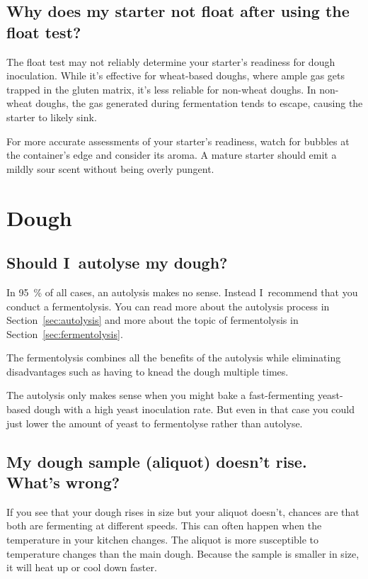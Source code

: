 \subsection{Why does my starter not float after using the float test?}
The float test may not reliably determine your starter's readiness for dough
inoculation. While it's effective for wheat-based doughs, where ample gas gets
trapped in the gluten matrix, it's less reliable for non-wheat doughs. In non-
wheat doughs, the gas generated during fermentation tends to escape, causing
the starter to likely sink.

For more accurate assessments of your starter's readiness, watch for bubbles
at the container's edge and consider its aroma. A mature starter should emit a
mildly sour scent without being overly pungent.

\section{Dough}
\subsection{Should I~autolyse my dough?}

In \qty{95}{\percent} of all cases, an autolysis
makes no sense. Instead I~recommend
that you conduct a fermentolysis. You
can read more about the autolysis process in
Section~\ref{sec:autolysis} and
more about the topic of fermentolysis
in Section~\ref{sec:fermentolysis}.

The fermentolysis combines all the benefits
of the autolysis while eliminating disadvantages
such as having to knead the dough multiple times.

The autolysis only makes sense when you might
bake a fast-fermenting yeast-based dough with a
high yeast inoculation rate. But even in that
case you could just lower the amount of yeast
to fermentolyse rather than autolyse.

\subsection{My dough sample (aliquot) doesn't rise. What's wrong?}

If you see that your dough rises in size but your aliquot doesn't, chances
are that both are fermenting at different speeds. This can often
happen when the temperature in your kitchen changes. The aliquot
is more susceptible to temperature changes than the main dough.
Because the sample is smaller in size, it will heat up or cool down
faster.

